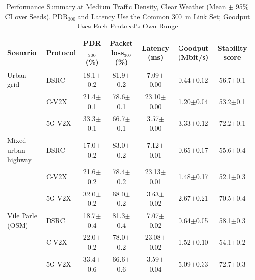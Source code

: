 \begin{table}[t]
\caption{Performance Summary at Medium Traffic Density, Clear Weather (Mean $\pm$ 95\% CI over \nSeeds{} Seeds). PDR$_{300}$ and Latency Use the Common 300~m Link Set; Goodput Uses Each Protocol's Own Range}
\label{tab:main}
\centering\footnotesize
\begin{tabular}{@{}llccccc@{}}
\toprule
Scenario & Protocol & PDR$_{300}$ (\%) & Packet loss$_{300}$ (\%) & Latency (ms) & Goodput (Mbit/s) & Stability score \\
\midrule
Urban grid & DSRC & 18.1$\pm$0.2 & 81.9$\pm$0.2 & 7.09$\pm$0.00 & 0.44$\pm$0.02 & 56.7$\pm$0.1 \\
 & C-V2X & 21.4$\pm$0.1 & 78.6$\pm$0.1 & 23.10$\pm$0.00 & 1.20$\pm$0.04 & 53.2$\pm$0.1 \\
 & 5G-V2X & 33.3$\pm$0.1 & 66.7$\pm$0.1 & 3.57$\pm$0.00 & 3.33$\pm$0.12 & 72.2$\pm$0.1 \\
\midrule
Mixed urban-highway & DSRC & 17.0$\pm$0.2 & 83.0$\pm$0.2 & 7.12$\pm$0.01 & 0.65$\pm$0.07 & 55.6$\pm$0.4 \\
 & C-V2X & 21.6$\pm$0.2 & 78.4$\pm$0.2 & 23.13$\pm$0.01 & 1.48$\pm$0.17 & 52.1$\pm$0.3 \\
 & 5G-V2X & 32.0$\pm$0.2 & 68.0$\pm$0.2 & 3.63$\pm$0.02 & 2.67$\pm$0.21 & 70.5$\pm$0.4 \\
\midrule
Vile Parle (OSM) & DSRC & 18.7$\pm$0.4 & 81.3$\pm$0.4 & 7.07$\pm$0.02 & 0.64$\pm$0.05 & 58.1$\pm$0.3 \\
 & C-V2X & 22.0$\pm$0.2 & 78.0$\pm$0.2 & 23.08$\pm$0.02 & 1.52$\pm$0.10 & 54.1$\pm$0.2 \\
 & 5G-V2X & 33.4$\pm$0.6 & 66.6$\pm$0.6 & 3.59$\pm$0.04 & 5.09$\pm$0.33 & 72.7$\pm$0.3 \\
\bottomrule
\end{tabular}
\end{table}
